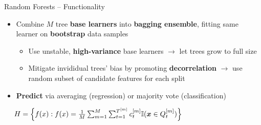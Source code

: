\begin{frame}{Random Forests -- Functionality}

 
  

\medskip

\begin{itemize}
  \item Combine $M$ tree \textbf{base learners} into 
  \textbf{bagging ensemble}, fitting same learner on \textbf{bootstrap} data
  samples
   \begin{itemize}
    \item Use unstable, \textbf{high-variance} base learners $\rightarrow$
    let trees grow to full size
    \item Mitigate invididual trees' bias by promoting \textbf{decorrelation} 
    $\rightarrow$ use random subset of 
    candidate features for each split
  \end{itemize}
  \item \textbf{Predict} via averaging (regression) or majority vote 
  (classification)
\end{itemize}

\medskip

 ~~
$H = \left\{ f(x): f(x) = \frac{1}{M} \sum_{m = 1}^M \sum_{t = 1}^{T^{[m]}} 
c_t^{[m]} \mathbb{I}(\bm{x} \in Q_t^{[m]}) \right\}$

\medskip


\end{frame}
